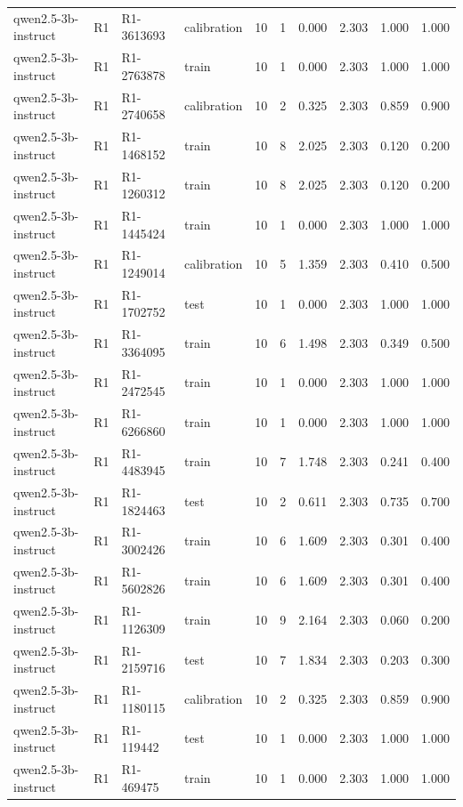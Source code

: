 \begin{table}
\begin{tabular}{llllrrrrrr}
qwen2.5-3b-instruct & R1 & R1-3613693 & calibration & 10 & 1 & 0.000 & 2.303 & 1.000 & 1.000 \\
qwen2.5-3b-instruct & R1 & R1-2763878 & train & 10 & 1 & 0.000 & 2.303 & 1.000 & 1.000 \\
qwen2.5-3b-instruct & R1 & R1-2740658 & calibration & 10 & 2 & 0.325 & 2.303 & 0.859 & 0.900 \\
qwen2.5-3b-instruct & R1 & R1-1468152 & train & 10 & 8 & 2.025 & 2.303 & 0.120 & 0.200 \\
qwen2.5-3b-instruct & R1 & R1-1260312 & train & 10 & 8 & 2.025 & 2.303 & 0.120 & 0.200 \\
qwen2.5-3b-instruct & R1 & R1-1445424 & train & 10 & 1 & 0.000 & 2.303 & 1.000 & 1.000 \\
qwen2.5-3b-instruct & R1 & R1-1249014 & calibration & 10 & 5 & 1.359 & 2.303 & 0.410 & 0.500 \\
qwen2.5-3b-instruct & R1 & R1-1702752 & test & 10 & 1 & 0.000 & 2.303 & 1.000 & 1.000 \\
qwen2.5-3b-instruct & R1 & R1-3364095 & train & 10 & 6 & 1.498 & 2.303 & 0.349 & 0.500 \\
qwen2.5-3b-instruct & R1 & R1-2472545 & train & 10 & 1 & 0.000 & 2.303 & 1.000 & 1.000 \\
qwen2.5-3b-instruct & R1 & R1-6266860 & train & 10 & 1 & 0.000 & 2.303 & 1.000 & 1.000 \\
qwen2.5-3b-instruct & R1 & R1-4483945 & train & 10 & 7 & 1.748 & 2.303 & 0.241 & 0.400 \\
qwen2.5-3b-instruct & R1 & R1-1824463 & test & 10 & 2 & 0.611 & 2.303 & 0.735 & 0.700 \\
qwen2.5-3b-instruct & R1 & R1-3002426 & train & 10 & 6 & 1.609 & 2.303 & 0.301 & 0.400 \\
qwen2.5-3b-instruct & R1 & R1-5602826 & train & 10 & 6 & 1.609 & 2.303 & 0.301 & 0.400 \\
qwen2.5-3b-instruct & R1 & R1-1126309 & train & 10 & 9 & 2.164 & 2.303 & 0.060 & 0.200 \\
qwen2.5-3b-instruct & R1 & R1-2159716 & test & 10 & 7 & 1.834 & 2.303 & 0.203 & 0.300 \\
qwen2.5-3b-instruct & R1 & R1-1180115 & calibration & 10 & 2 & 0.325 & 2.303 & 0.859 & 0.900 \\
qwen2.5-3b-instruct & R1 & R1-119442 & test & 10 & 1 & 0.000 & 2.303 & 1.000 & 1.000 \\
qwen2.5-3b-instruct & R1 & R1-469475 & train & 10 & 1 & 0.000 & 2.303 & 1.000 & 1.000 \\

\end{tabular}
\end{table}
